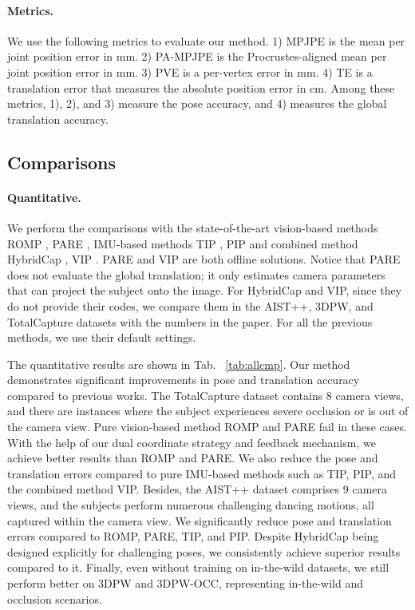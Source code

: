 \paragraph{Metrics.}
%
We use the following metrics to evaluate our method.
%
1) MPJPE is the mean per joint position error in mm.
%
2) PA-MPJPE is the Procrustes-aligned mean per joint position error in mm.
%
3) PVE is a per-vertex error in mm.
%
4) TE is a translation error that measures the absolute position error in cm.
%
Among these metrics, 1), 2), and 3) measure the pose accuracy, and 4) measures the global translation accuracy.
%
\subsection{Comparisons}\label{sec:comparisons}
\paragraph{Quantitative.}
We perform the comparisons with the state-of-the-art vision-based methods ROMP \cite{ROMP}, PARE \cite{PARE}, IMU-based methods TIP \cite{TIP}, PIP \cite{PIP} and combined method HybridCap \cite{HybridCap}, VIP \cite{VIP}.
%
PARE and VIP are both offline solutions.
%
Notice that PARE does not evaluate the global translation; it only estimates camera parameters that can project the subject onto the image.
%
For HybridCap and VIP, since they do not provide their codes, we compare them in the AIST++, 3DPW, and TotalCapture datasets with the numbers in the paper.
%
For all the previous methods, we use their default settings.
%
\par
%
The quantitative results are shown in Tab. ~\ref{tab:allcmp}.
%
Our method demonstrates significant improvements in pose and translation accuracy compared to previous works.
%
The TotalCapture dataset contains 8 camera views, and there are instances where the subject experiences severe occlusion or is out of the camera view.
%
Pure vision-based method ROMP and PARE fail in these cases.
%
With the help of our dual coordinate strategy and feedback mechanism, we achieve better results than ROMP and PARE.
%
We also reduce the pose and translation errors compared to pure IMU-based methods such as TIP, PIP, and the combined method VIP.
%
Besides, the AIST++ dataset comprises 9 camera views, and the subjects perform numerous challenging dancing motions, all captured within the camera view.
%
We significantly reduce pose and translation errors compared to ROMP, PARE, TIP, and PIP.
%
Despite HybridCap being designed explicitly for challenging poses, we consistently achieve superior results compared to it.
%
Finally, even without training on in-the-wild datasets, we still perform better on 3DPW and 3DPW-OCC, representing in-the-wild and occlusion scenarios.
%
